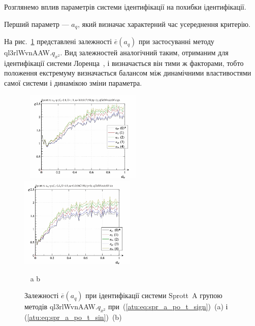 Розглянемо вплив параметрів системи ідентифікації на похибки
ідентифікації.

Перший параметр ---
$a_q$, який визначає характерний час усереднення критерію.

На рис.~\ref{atu:f:spr_a_a_q_ql3rlWvnAAW_q_x2} представлені залежності
$\overline{e} (a_q)$ при застосуванні методу ql3rlWvnAAW.$q_{x^2}$. Вид залежностей аналогічний таким, отриманим для
ідентифікації системи Лоренца~\cite{atu_kher2015}, і визначається він
тими ж факторами, тобто положення екстремуму визначається
балансом між динамічними властивостями самої системи і
динамікою зміни параметра.


\begin{figure}[htb!]
\begin{center}
  ~ \hfill
    \includegraphics[width=0.49\textwidth]{p/cha/spr_a/ql3rlWvnAAW_x2/sprott_a_id-p_a_q_sign.png}
    \hfill
    \includegraphics[width=0.49\textwidth]{p/cha/spr_a/ql3rlWvnAAW_x2/sprott_a_id-p_a_q_sin.png}
  \hfill ~
\end{center}
  \vspace{-1.0ex}
  \begin{center}
    ~ \hfill a \hfill\hfill b \hfill ~
  \end{center}
  \caption{Залежності $\overline{e}(a_q)$ при ідентифікації системи Sprott~A групою методів ql3rlWvnAAW.$q_{x^2}$ при~(\ref{atu:eq:spr_a_po_t_sign})~(a) і (\ref{atu:eq:spr_a_po_t_sin})~(b)}
  \label{atu:f:spr_a_a_q_ql3rlWvnAAW_q_x2}
\end{figure}


